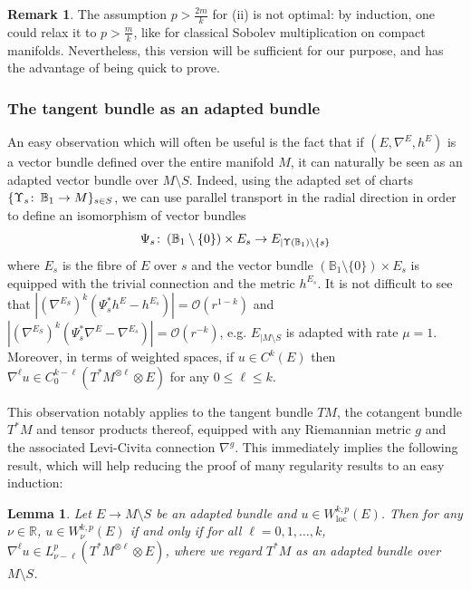 \documentclass{article}
\numberwithin{equation}{section}        %
\theoremstyle{bfnote}
\newtheorem{lem}[thm]{Lemma}                %
\theoremstyle{definition}
\theoremstyle{bfremark}
\newtheorem{rem}[thm]{Remark}               %
\newcommand{\col}{\colon \thinspace}        %
\newcommand{\R}{\mathbb{R}}                 %
\newcommand{\Ball}{\mathbb{B}}              %
\begin{document}
\begin{rem}
    The assumption $p > \frac{2m}{k}$ for (ii) is not optimal: by induction, one could relax it to $p > \frac{m}{k}$, like for classical Sobolev multiplication on compact manifolds. Nevertheless, this version will be sufficient for our purpose, and has the advantage of being quick to prove. 
\end{rem}


    \subsubsection{The tangent bundle as an adapted bundle}        \label{subsubsec: The tangent bundle as adapted bundle}

An easy observation which will often be useful is the fact that if $(E,\nabla^E,h^E)$ is a vector bundle defined over the entire manifold $M$, it can naturally be seen as an adapted vector bundle over $M \setminus S$. Indeed, using the adapted set of charts $\{\Upsilon_s \col \Ball_1 \to M\}_{s \in S}$, we can use parallel transport in the radial direction in order to define an isomorphism of vector bundles
\begin{equation*}
    \Psi_s \col (\Ball_1 \setminus \{0\}) \times E_s \to E_{|\Upsilon(\Ball_1) \setminus \{s\}}
\end{equation*}
where $E_s$ is the fibre of $E$ over $s$ and the vector bundle $(\Ball_1 \setminus \{0\}) \times E_s$ is equipped with the trivial connection and the metric $h^{E_s}$. It is not difficult to see that $|(\nabla^{E_S})^k(\Psi_s^* h^E - h^{E_s})| = \mathcal{O}(r^{1-k})$ and $|(\nabla^{E_S})^k(\Psi_s^* \nabla^E - \nabla^{E_s})| = \mathcal{O}(r^{-k})$, e.g. $E_{|M\setminus S}$ is adapted with rate $\mu = 1$. Moreover, in terms of weighted spaces, if $u \in C^k(E)$ then $\nabla^\ell u \in C^{k-\ell}_0(T^*M^{\otimes \ell} \otimes E)$ for any $0 \leq \ell \leq k$.

This observation notably applies to the tangent bundle $TM$, the cotangent bundle $T^*M$ and tensor products thereof, equipped with any Riemannian metric $g$ and the associated Levi-Civita connection $\nabla^g$. This immediately implies the following result, which will help reducing the proof of many regularity results to an easy induction:

\begin{lem}     \label{lem: Covariant derivatives in weighted spaces}
    Let $E \to M \setminus S$ be an adapted bundle and $u \in W^{k,p}_{\mathrm{loc}}(E)$. Then for any $\nu \in \R$, $u \in W^{k,p}_\nu(E)$ if and only if for all $\ell = 0,1,\ldots,k$, $\nabla^\ell u \in L^p_{\nu-\ell}(T^*M^{\otimes \ell} \otimes E)$, where we regard $T^*M$ as an adapted bundle over $M \setminus S$.
\end{lem}
\end{document}
